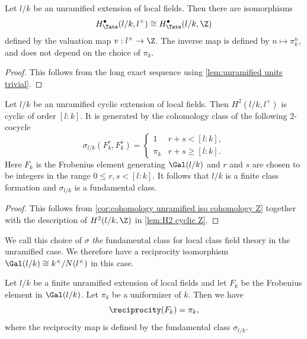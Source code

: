 \begin{corollary} \label{cor:cohomology unramified iso cohomology Z}
	Let $l/k$ be an unramified extension of local fields.
	Then there are isomorphisms
	\[
		H^\bullet_{\Tate}(l/k,l^\times) \cong H^\bullet_{\Tate} (l/k,\Z)
	\]
	defined by the valuation map $v : l^\times \to \Z$.
	The inverse map is defined by $n \mapsto \pi_k^n$, and does not depend on the choice of $\pi_k$.
\end{corollary}

\begin{proof}
	This follows from the long exact sequence using \ref{lem:unramified units trivial}.
\end{proof}


\begin{lemma} \label{lem:unramified fundamental class}
	Let $l/k$ be an unramified cyclic extension of local fields.
	Then $H^2(l/k,l^\times)$ is cyclic of order $[l:k]$.
	It is generated by the cohomology class of the following 2-cocycle
	\[
		\sigma_{l/k} (F_k^r, F_k^s) =
		\begin{cases}
			1 & r + s < [l:k], \\
			\pi_k & r + s \ge [l:k].
		\end{cases}
	\]
	Here $F_k$ is the Frobenius element generating $\Gal(l/k)$ and $r$ and $s$
	are chosen to be integers in the range $0 \le r,s <[l:k]$.
	It follows that $l / k$ is a finite class formation and $\sigma_{l/k}$ is a fundamental class.
\end{lemma}

\begin{proof}
	This follows from \ref{cor:cohomology unramified iso cohomology Z}
	together with the description of $H^2(l/k,\Z)$ in \ref{lem:H2 cyclic Z}.
\end{proof}

We call this choice of $\sigma$ \emph{the} fundamental class for local class field theory
in the unramified case.
We therefore have a reciprocity isomorphism $\Gal(l/k) \cong k^\times / N(l^\times)$ in
this case.

\begin{lemma} \label{lem:local unramified reciprocity}
	Let $l/k$ be a finite unramified extension of local fields and let $F_k$ be the Frobenius
	element in $\Gal(l/k)$. Let $\pi_k$ be a uniformizer of $k$. Then we have
	\[
		\reciprocity (F_k)= \pi_k,
	\]
	where the reciprocity map is defined by the fundamental class $\sigma_{l/k}$.
\end{lemma}

